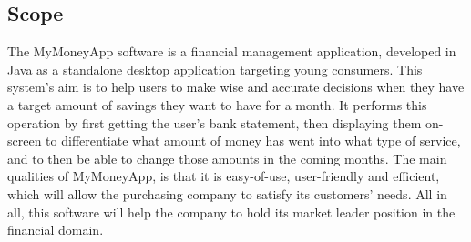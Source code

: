 \documentclass[letterpaper]{article}
\begin{document}
	\subsection{Scope}
	
		The MyMoneyApp software is a financial management application, developed in Java as a standalone desktop application targeting young consumers. This system’s aim is to help users to make wise and accurate decisions when they have a target amount of savings they want to have for a month. It performs this operation by first getting the user’s bank statement, then displaying them on-screen to differentiate what amount of money has went into what type of service, and to then be able to change those amounts in the coming months. The main qualities of MyMoneyApp, is that it is easy-of-use, user-friendly and efficient, which will allow the purchasing company to satisfy its customers’ needs. All in all, this software will help the company to hold its market leader position in the financial domain.
	
	\newpage
\end{document}
